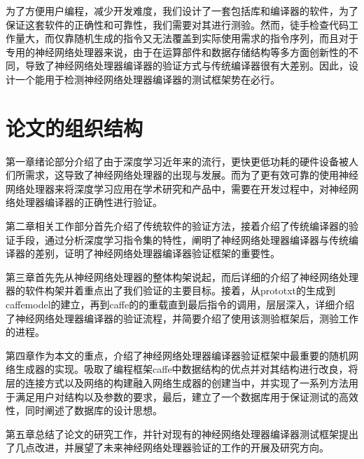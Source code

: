 为了方便用户编程，减少开发难度，我们设计了一套包括库和编译器的软件，为了保证这套软件的正确性和可靠性，我们需要对其进行测验。然而，徒手检查代码工作量大，而仅靠随机生成的指令又无法覆盖到实际使用需求的指令序列，而且对于专用的神经网络处理器来说，由于在运算部件和数据存储结构等多方面创新性的不同，导致了神经网络处理器编译器的验证方式与传统编译器很有大差别。因此，设计一个能用于检测神经网络处理器编译器的测试框架势在必行。

\section{论文的组织结构}
第一章绪论部分介绍了由于深度学习近年来的流行，更快更低功耗的硬件设备被人们所需求，这导致了神经网络处理器的出现与发展。而为了更有效可靠的使用神经网络处理器来将深度学习应用在学术研究和产品中，需要在开发过程中，对神经网络处理器编译器的正确性进行验证。

第二章相关工作部分首先介绍了传统软件的验证方法，接着介绍了传统编译器的验证手段，通过分析深度学习指令集的特性，阐明了神经网络处理器编译器与传统编译器的差别，证明了神经网络处理器编译器验证框架的重要性。

第三章首先先从神经网络处理器的整体构架说起，而后详细的介绍了神经网络处理器的软件构架并着重点出了我们验证的主要目标。接着，从prototxt的生成到caffemodel的建立，再到caffe的的重载直到最后指令的调用，层层深入，详细介绍了神经网络处理器编译器的验证流程，并简要介绍了使用该测验框架后，测验工作的进程。

第四章作为本文的重点，介绍了神经网络处理器编译器验证框架中最重要的随机网络生成器的实现。吸取了编程框架caffe中数据结构的优点并对其结构进行改良，将层的连接方式以及网络的构建融入网络生成器的创建当中，并实现了一系列方法用于满足用户对结构以及参数的要求，最后，建立了一个数据库用于保证测试的高效性，同时阐述了数据库的设计思想。

第五章总结了论文的研究工作，并针对现有的神经网络处理器编译器测试框架提出了几点改进，并展望了未来神经网络处理器验证的工作的开展及研究方向。

